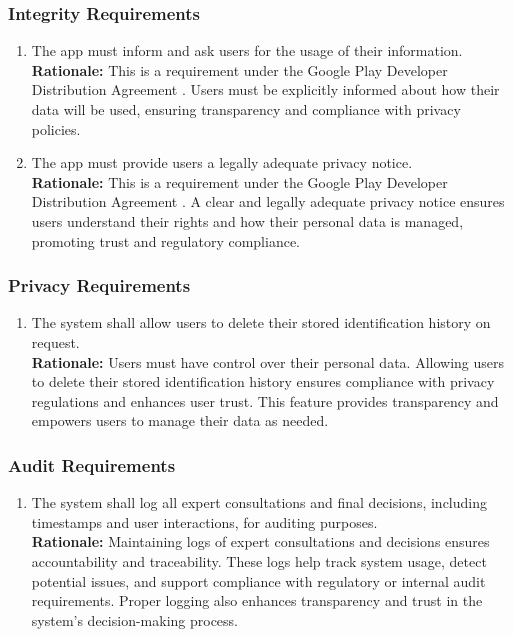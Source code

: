 \documentclass[]{article}
\begin{document}
\subsubsection{Integrity Requirements}
\label{ssub:integrity_requirements}
\begin{enumerate}[{SR-P}1. ]
    \item The app must inform and ask users for the usage of their information.
    \\ \textbf{Rationale:} This is a requirement under the Google Play Developer Distribution Agreement \cite{GooglePlayAgreement}. Users must be explicitly informed about how their data will be used, ensuring transparency and compliance with privacy policies.

    \item The app must provide users a legally adequate privacy notice.
    \\ \textbf{Rationale:} This is a requirement under the Google Play Developer Distribution Agreement \cite{GooglePlayAgreement}. A clear and legally adequate privacy notice ensures users understand their rights and how their personal data is managed, promoting trust and regulatory compliance.
\end{enumerate}

\subsubsection{Privacy Requirements}
\label{ssub:privacy_requirements}
\begin{enumerate}[{SR-P}1. ]
	\item The system shall allow users to delete their stored identification history on request.
	\\ \textbf{Rationale:}  Users must have control over their personal data. Allowing users to delete their stored identification history ensures compliance with privacy regulations and enhances user trust. This feature provides transparency and empowers users to manage their data as needed.
\end{enumerate}

\subsubsection{Audit Requirements}
\label{ssub:audit_requirements}
\begin{enumerate}[{SR-AU}1. ]
	\item The system shall log all expert consultations and final decisions, including timestamps and user interactions, for auditing purposes.
	\\ \textbf{Rationale:} Maintaining logs of expert consultations and decisions ensures accountability and traceability. These logs help track system usage, detect potential issues, and support compliance with regulatory or internal audit requirements. Proper logging also enhances transparency and trust in the system’s decision-making process.
\end{enumerate}
\end{document}
